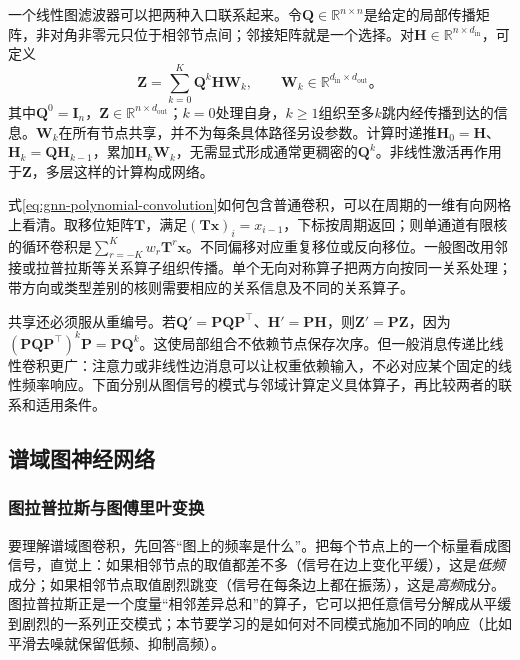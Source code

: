 一个线性图滤波器可以把两种入口联系起来。令$\bm{Q}\in\mathbb{R}^{n\times n}$是给定的局部传播矩阵，非对角非零元只位于相邻节点间；邻接矩阵就是一个选择。对$\bm{H}\in\mathbb{R}^{n\times d_{\mathrm{in}}}$，可定义
\begin{equation}
  \bm{Z}=\sum_{k=0}^{K}\bm{Q}^{k}\bm{H}\bm{W}_k,
  \qquad \bm{W}_k\in\mathbb{R}^{d_{\mathrm{in}}\times d_{\mathrm{out}}}\text{。}
  \label{eq:gnn-polynomial-convolution}
\end{equation}
其中$\bm{Q}^0=\bm{I}_n$，$\bm{Z}\in\mathbb{R}^{n\times d_{\mathrm{out}}}$；$k=0$处理自身，$k\geq1$组织至多$k$跳内经传播到达的信息。$\bm{W}_k$在所有节点共享，并不为每条具体路径另设参数。计算时递推$\bm{H}_0=\bm{H}$、$\bm{H}_k=\bm{Q}\bm{H}_{k-1}$，累加$\bm{H}_k\bm{W}_k$，无需显式形成通常更稠密的$\bm{Q}^k$。非线性激活再作用于$\bm{Z}$，多层这样的计算构成网络。

式\eqref{eq:gnn-polynomial-convolution}如何包含普通卷积，可以在周期的一维有向网格上看清。取移位矩阵$\bm{T}$，满足$(\bm{T}\bm{x})_i=x_{i-1}$，下标按周期返回；则单通道有限核的循环卷积是$\sum_{r=-K}^{K}w_r\bm{T}^{r}\bm{x}$。不同偏移对应重复移位或反向移位。一般图改用邻接或拉普拉斯等关系算子组织传播。单个无向对称算子把两方向按同一关系处理；带方向或类型差别的核则需要相应的关系信息及不同的关系算子。

共享还必须服从重编号。若$\bm{Q}'=\bm{P}\bm{Q}\bm{P}^{\top}$、$\bm{H}'=\bm{P}\bm{H}$，则$\bm{Z}'=\bm{P}\bm{Z}$，因为$(\bm{P}\bm{Q}\bm{P}^{\top})^k\bm{P}=\bm{P}\bm{Q}^k$。这使局部组合不依赖节点保存次序。但一般消息传递比线性卷积更广：注意力或非线性边消息可以让权重依赖输入，不必对应某个固定的线性频率响应。下面分别从图信号的模式与邻域计算定义具体算子，再比较两者的联系和适用条件。

\subsection{谱域图神经网络}
\label{sec:gnn-spectral}

\subsubsection{图拉普拉斯与图傅里叶变换}
\label{sec:gnn-graph-fourier}

要理解谱域图卷积，先回答“图上的频率是什么”。把每个节点上的一个标量看成图信号，直觉上：如果相邻节点的取值都差不多（信号在边上变化平缓），这是\emph{低频}成分；如果相邻节点取值剧烈跳变（信号在每条边上都在振荡），这是\emph{高频}成分。图拉普拉斯正是一个度量“相邻差异总和”的算子，它可以把任意信号分解成从平缓到剧烈的一系列正交模式；本节要学习的是如何对不同模式施加不同的响应（比如平滑去噪就保留低频、抑制高频）。

